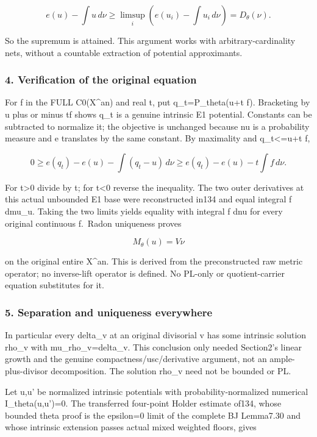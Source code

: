 \documentclass[
]{article}
\begin{document}
\[e(u)-\int u\,d\nu\geq\limsup_i\left(e(u_i)-\int u_i\,d\nu\right)=D_\theta(\nu).\]

So the supremum is attained. This argument works with
arbitrary-cardinality nets, without a countable extraction of potential
approximants.

\subsubsection{4. Verification of the original
equation}\label{verification-of-the-original-equation}

For f in the FULL C0(X\^{}an) and real t, put q\_t=P\_theta(u+t f).
Bracketing by u plus or minus
\textbar t\textbar\textbar\textbar f\textbar\textbar{} shows q\_t is a
genuine intrinsic E1 potential. Constants can be subtracted to normalize
it; the objective is unchanged because nu is a probability measure and e
translates by the same constant. By maximality and q\_t\textless=u+t f,

\[0\geq e(q_t)-e(u)-\int(q_t-u)\,d\nu
\geq e(q_t)-e(u)-t\int f\,d\nu.\]

For t\textgreater0 divide by t; for t\textless0 reverse the inequality.
The two outer derivatives at this actual unbounded E1 base were
reconstructed in134 and equal integral f dmu\_u. Taking the two limits
yields equality with integral f dnu for every original continuous
f.~Radon uniqueness proves

\[M_\theta(u)=V\nu\]

on the original entire X\^{}an. This is derived from the preconstructed
raw metric operator; no inverse-lift operator is defined. No PL-only or
quotient-carrier equation substitutes for it.

\subsubsection{5. Separation and uniqueness
everywhere}\label{separation-and-uniqueness-everywhere}

In particular every delta\_v at an original divisorial v has some
intrinsic solution rho\_v with mu\_rho\_v=delta\_v. This conclusion only
needed Section2's linear growth and the genuine
compactness/usc/derivative argument, not an ample-plus-divisor
decomposition. The solution rho\_v need not be bounded or PL.

Let u,u' be normalized intrinsic potentials with probability-normalized
numerical I\_theta(u,u')=0. The transferred four-point Holder estimate
of134, whose bounded theta proof is the epsilon=0 limit of the complete
BJ Lemma7.30 and whose intrinsic extension passes actual mixed weighted
floors, gives
\end{document}
